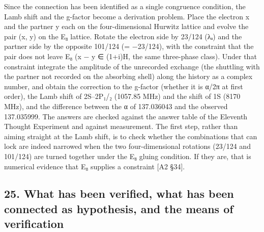 \documentclass[
  a4paper,
]{article}
\begin{document}
Since the connection has been identified as a single congruence
condition, the Lamb shift and the g-factor become a derivation problem.
Place the electron x and the partner y each on the four-dimensional
Hurwitz lattice and evolve the pair (x, y) on the E₈ lattice. Rotate the
electron side by 23/124 (λₐ) and the partner side by the opposite
101/124 (= −23/124), with the constraint that the pair does not leave E₈
(x − y ∈ (1+i)H, the same three-phase class). Under that constraint
integrate the amplitude of the unrecorded exchange (the shuttling with
the partner not recorded on the absorbing shell) along the history as a
complex number, and obtain the correction to the g-factor (whether it is
α/2π at first order), the Lamb shift of 2S--2P₁/₂ (1057.85 MHz) and the
shift of 1S (8170 MHz), and the difference between the α of 137.036043
and the observed 137.035999. The answers are checked against the answer
table of the Eleventh Thought Experiment and against measurement. The
first step, rather than aiming straight at the Lamb shift, is to check
whether the combinations that can lock are indeed narrowed when the two
four-dimensional rotations (23/124 and 101/124) are turned together
under the E₈ gluing condition. If they are, that is numerical evidence
that E₈ supplies a constraint {[}A2 §34{]}.

\subsection{25. What has been verified, what has been connected as
hypothesis, and the means of
verification}\label{what-has-been-verified-what-has-been-connected-as-hypothesis-and-the-means-of-verification}
\end{document}
